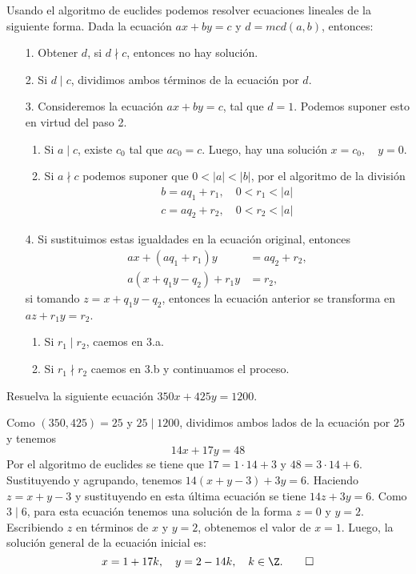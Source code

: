 Usando el algoritmo de euclides podemos resolver ecuaciones lineales de la siguiente forma.
Dada la ecuación $ax+by=c$ y $d = mcd(a,b)$, entonces:
\begin{enumerate}
    \item [1.] Obtener $d$, si $d\nmid c$, entonces no hay solución.
    \item [2.] Si $d \mid c$, dividimos ambos términos de la ecuación por $d$.
    \item [3.] Consideremos la ecuación $ax+by=c$, tal que $d = 1$. Podemos suponer esto en virtud del paso 2.
    \begin{enumerate}
        \item Si $a \mid c$, existe $c_0$ tal que $ac_0 = c$. Luego, hay una solución $x = c_0, \quad y = 0$.
        \item Si $a \nmid c$ podemos suponer que $0 <|a|<|b|$, por el algoritmo de la división
        \begin{align*}
            b = aq_1+r_1, \quad 0<r_1<|a|\\
            c = aq_2+r_2, \quad 0<r_2<|a|
        \end{align*}
    \end{enumerate}
    \item [4.] Si sustituimos estas igualdades en la ecuación original, entonces
    \begin{align*}
        ax + (a q_1 + r_1) y &= aq_2 + r_2,\\
        a(x + q_1 y -q_2) + r_1 y &= r_2,
    \end{align*}
    si tomando $z = x + q_1 y - q_2$, entonces la ecuación anterior se transforma en $az+r_1y=r_2$.
    \begin{enumerate}
        \item Si $r_1 \mid r_2$, caemos en 3.a.
        \item Si $r_1 \nmid r_2$ caemos en 3.b y continuamos el proceso.
    \end{enumerate}
\end{enumerate}

\begin{example}
    Resuelva la siguiente ecuación $350x + 425y = 1200$.
\end{example}
\begin{solution}
    Como $(350,425)=25$ y $25 \mid 1200$, dividimos ambos lados de la ecuación por $25$ y tenemos
    \[
        14x+17y=48
    \]
    Por el algoritmo de euclides se tiene que $17 = 1\cdot14+3$ y $48=3\cdot14+6$.
    Sustituyendo y agrupando, tenemos $14(x+y-3)+3y=6.$
    Haciendo $z=x+y-3$ y sustituyendo en esta última ecuación se tiene $14z+3y=6.$
    Como $3\mid6$, para esta ecuación tenemos una solución de la forma $z=0$ y $y=2$.
    Escribiendo $z$ en términos de $x$ y $y=2$, obtenemos el valor de $x=1$.
    Luego, la solución general de la ecuación inicial es:
    \[
        x=1+17k, \quad y=2-14k, \quad k \in \Z. \qedhere
    \]
\end{solution}

